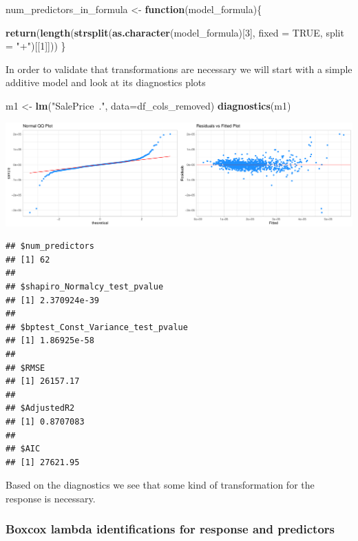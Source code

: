 \documentclass[
]{article}
\newenvironment{Shaded}{\begin{snugshade}}{\end{snugshade}}
\newcommand{\ControlFlowTok}[1]{\textcolor[rgb]{0.13,0.29,0.53}{\textbf{#1}}}
\newcommand{\DataTypeTok}[1]{\textcolor[rgb]{0.13,0.29,0.53}{#1}}
\newcommand{\DecValTok}[1]{\textcolor[rgb]{0.00,0.00,0.81}{#1}}
\newcommand{\KeywordTok}[1]{\textcolor[rgb]{0.13,0.29,0.53}{\textbf{#1}}}
\newcommand{\NormalTok}[1]{#1}
\newcommand{\OtherTok}[1]{\textcolor[rgb]{0.56,0.35,0.01}{#1}}
\newcommand{\StringTok}[1]{\textcolor[rgb]{0.31,0.60,0.02}{#1}}
\begin{document}
\begin{Shaded}
\begin{Highlighting}[]
\NormalTok{num_predictors_in_formula <-}\StringTok{ }\ControlFlowTok{function}\NormalTok{(model_formula)\{}

  \KeywordTok{return}\NormalTok{(}\KeywordTok{length}\NormalTok{(}\KeywordTok{strsplit}\NormalTok{(}\KeywordTok{as.character}\NormalTok{(model_formula)[}\DecValTok{3}\NormalTok{], }\DataTypeTok{fixed =} \OtherTok{TRUE}\NormalTok{, }\DataTypeTok{split =} \StringTok{"+"}\NormalTok{)[[}\DecValTok{1}\NormalTok{]]))}
\NormalTok{\}}
\end{Highlighting}
\end{Shaded}

In order to validate that transformations are necessary we will start with a simple additive model and look at its diagnostics plots

\begin{Shaded}
\begin{Highlighting}[]
\NormalTok{m1 <-}\StringTok{ }\KeywordTok{lm}\NormalTok{(}\StringTok{"SalePrice~."}\NormalTok{, }\DataTypeTok{data=}\NormalTok{df_cols_removed)}
\KeywordTok{diagnostics}\NormalTok{(m1)}
\end{Highlighting}
\end{Shaded}

\includegraphics{Final-Project_files/figure-latex/unnamed-chunk-15-1.pdf}

\begin{verbatim}
## $num_predictors
## [1] 62
## 
## $shapiro_Normalcy_test_pvalue
## [1] 2.370924e-39
## 
## $bptest_Const_Variance_test_pvalue
## [1] 1.86925e-58
## 
## $RMSE
## [1] 26157.17
## 
## $AdjustedR2
## [1] 0.8707083
## 
## $AIC
## [1] 27621.95
\end{verbatim}

Based on the diagnostics we see that some kind of transformation for the response is necessary.

\hypertarget{boxcox-lambda-identifications-for-response-and-predictors}{%
\subsubsection{Boxcox lambda identifications for response and predictors}\label{boxcox-lambda-identifications-for-response-and-predictors}}
\end{document}
